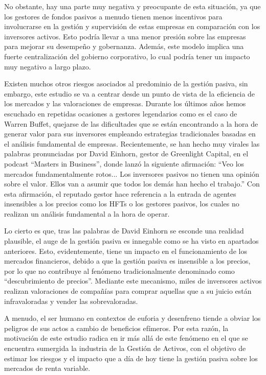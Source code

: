 \documentclass[12pt,a4paper]{article}
\begin{document}
No obstante, hay una parte muy negativa y preocupante de esta situación, ya que los gestores de fondos pasivos a menudo tienen menos incentivos para involucrarse en la gestión y supervisión de estas empresas en comparación con los inversores activos. Esto podría llevar a una menor presión sobre las empresas para mejorar su desempeño y gobernanza. Además, este modelo implica una fuerte centralización del gobierno corporativo, lo cual podría tener un impacto muy negativo a largo plazo.

Existen muchos otros riesgos asociados al predominio de la gestión pasiva, sin embargo, este estudio se va a centrar desde un punto de vista de la eficiencia de los mercados y las valoraciones de empresas. Durante los últimos años hemos escuchado en repetidas ocasiones a gestores legendarios como es el caso de Warren Buffet, quejarse de las dificultades que se están encontrando a la hora de generar valor para sus inversores empleando estrategias tradicionales basadas en el análisis fundamental de empresas. Recientemente, se han hecho muy virales las palabras pronunciadas por David Einhorn, gestor de Greenlight Capital, en el podcast ``Masters in Business'', donde lanzó la siguiente afirmación: ``Veo los mercados fundamentalmente rotos... Los inversores pasivos no tienen una opinión sobre el valor. Ellos van a asumir que todos los demás han hecho el trabajo.'' Con esta afirmación, el reputado gestor hace referencia a la entrada de agentes insensibles a los precios como los HFTs o los gestores pasivos, los cuales no realizan un análisis fundamental a la hora de operar.

Lo cierto es que, tras las palabras de David Einhorn se esconde una realidad plausible, el auge de la gestión pasiva es innegable como se ha visto en apartados anteriores. Esto, evidentemente, tiene un impacto en el funcionamiento de los mercados financieros, debido a que la gestión pasiva es insensible a los precios, por lo que no contribuye al fenómeno tradicionalmente denominado como ``descubrimiento de precios''. Mediante este mecanismo, miles de inversores activos realizan valoraciones de compañías para comprar aquellas que a su juicio están infravaloradas y vender las sobrevaloradas.

A menudo, el ser humano en contextos de euforia y desenfreno tiende a obviar los peligros de sus actos a cambio de beneficios efímeros. Por esta razón, la motivación de este estudio radica en ir más allá de este fenómeno en el que se encuentra sumergida la industria de la Gestión de Activos, con el objetivo de estimar los riesgos y el impacto que a día de hoy tiene la gestión pasiva sobre los mercados de renta variable.
\end{document}
